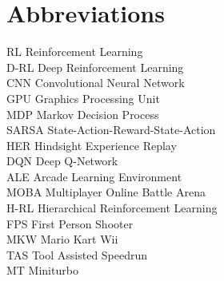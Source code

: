 
\chapter*{Abbreviations}

\begin{flushleft}

RL \hfill Reinforcement Learning
\\D-RL \hfill Deep Reinforcement Learning
\\CNN \hfill  Convolutional Neural Network
\\GPU \hfill  Graphics Processing Unit
\\MDP \hfill  Markov Decision Process
\\SARSA \hfill  State-Action-Reward-State-Action
\\HER \hfill  Hindsight Experience Replay
\\DQN \hfill  Deep Q-Network
\\ALE \hfill  Arcade Learning Environment
\\MOBA \hfill  Multiplayer Online Battle Arena
\\H-RL \hfill  Hierarchical Reinforcement Learning
\\FPS \hfill  First Person Shooter
\\MKW \hfill  Mario Kart Wii
\\TAS \hfill  Tool Assisted Speedrun
\\MT \hfill  Miniturbo

\end{flushleft}